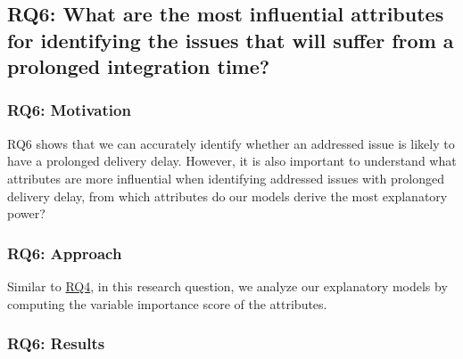 
\subsection{RQ6: What are the most influential attributes for                        
	identifying the issues that will suffer from a prolonged integration              
time?}\label{ch4:rq6}                                                                    
                                                                                    
\subsubsection*{RQ6: Motivation} RQ6 shows that we can accurately                    
identify whether an addressed issue is likely to have a prolonged delivery delay.         
However, it is also important to understand what attributes are more influential    
when identifying addressed issues with prolonged delivery delay, \ie from which attributes 
do our models derive the most explanatory power?                                    
                                                                                    
\subsubsection*{RQ6: Approach} Similar to \hyperref[ch4:rq4]{RQ4}, in this research
question, we analyze our explanatory models by computing the variable importance
score of the attributes.                                                                         

\subsubsection*{RQ6: Results}

